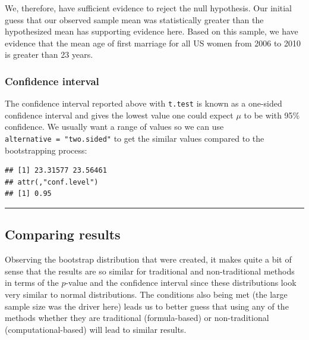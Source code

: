 \documentclass[]{tufte-book}
\newenvironment{Shaded}{\begin{snugshade}}{\end{snugshade}}
\newcommand{\KeywordTok}[1]{\textcolor[rgb]{0.13,0.29,0.53}{\textbf{{#1}}}}
\newcommand{\DataTypeTok}[1]{\textcolor[rgb]{0.13,0.29,0.53}{{#1}}}
\newcommand{\DecValTok}[1]{\textcolor[rgb]{0.00,0.00,0.81}{{#1}}}
\newcommand{\StringTok}[1]{\textcolor[rgb]{0.31,0.60,0.02}{{#1}}}
\newcommand{\NormalTok}[1]{{#1}}
\let\oldrule=\rule
\renewcommand{\rule}[1]{\oldrule{\linewidth}}
\begin{document}
We, therefore, have sufficient evidence to reject the null hypothesis.
Our initial guess that our observed sample mean was statistically
greater than the hypothesized mean has supporting evidence here. Based
on this sample, we have evidence that the mean age of first marriage for
all US women from 2006 to 2010 is greater than 23 years.

\subsubsection{Confidence interval}\label{confidence-interval}

The confidence interval reported above with \texttt{t.test} is known as
a one-sided confidence interval and gives the lowest value one could
expect \(\mu\) to be with 95\% confidence. We usually want a range of
values so we can use \texttt{alternative\ =\ "two.sided"} to get the
similar values compared to the bootstrapping process:

\begin{Shaded}
\end{Shaded}

\begin{verbatim}
## [1] 23.31577 23.56461
## attr(,"conf.level")
## [1] 0.95
\end{verbatim}

\begin{center}\rule{0.5\linewidth}{\linethickness}\end{center}

\subsection{Comparing results}\label{comparing-results}

Observing the bootstrap distribution that were created, it makes quite a
bit of sense that the results are so similar for traditional and
non-traditional methods in terms of the \(p\)-value and the confidence
interval since these distributions look very similar to normal
distributions. The conditions also being met (the large sample size was
the driver here) leads us to better guess that using any of the methods
whether they are traditional (formula-based) or non-traditional
(computational-based) will lead to similar results.
\end{document}
